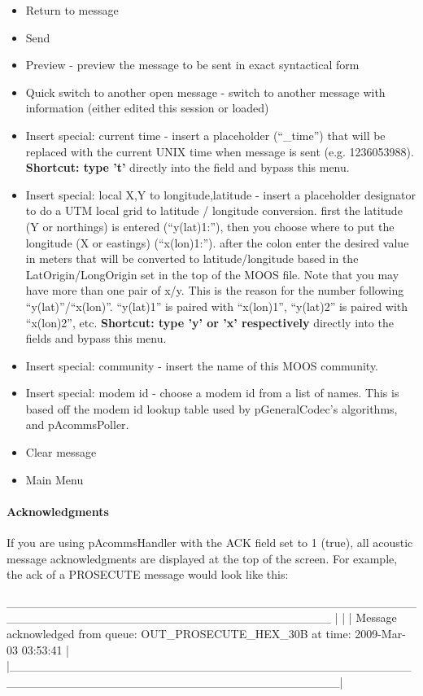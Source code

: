 \documentclass[11pt, letterpaper, oneside]{memoir}
\begin{document}
\begin{itemize}
\item Return to message
\item Send
\item Preview - preview the message to be sent in exact syntactical form
\item Quick switch to another open message - switch to another message with information (either edited this session or loaded)
\item Insert special: current time - insert a placeholder (``\_time'') that will be replaced with the current UNIX time when message is sent (e.g. 1236053988). \textbf{Shortcut: type 't'} directly into the field and bypass this menu.
\item Insert special: local X,Y to longitude,latitude - insert a placeholder designator to do a UTM local grid to latitude / longitude conversion. first the latitude (Y or northings) is entered (``y(lat)1:''), then you choose where to put the longitude (X or eastings) (``x(lon)1:''). after the colon enter the desired value in meters that will be converted to latitude/longitude based in the LatOrigin/LongOrigin set in the top of the MOOS file. Note that you may have more than one pair of x/y. This is the reason for the number following ``y(lat)''/``x(lon)''. ``y(lat)1'' is paired with ``x(lon)1'', ``y(lat)2'' is paired with ``x(lon)2'', etc. \textbf{Shortcut: type 'y' or 'x' respectively} directly into the fields and bypass this menu.
\item Insert special: community - insert the name of this MOOS community.
\item Insert special: modem id - choose a modem id from a list of names. This is based off the modem id lookup table used by pGeneralCodec's algorithms, and pAcommsPoller.
\item Clear message
\item Main Menu
\end{itemize}

\paragraph{Acknowledgments}
If you are using pAcommsHandler with the ACK field set to 1 (true), all acoustic message acknowledgments are displayed at the top of the screen. For example, the ack of a PROSECUTE message would look like this:
\begin{boxedverbatim}
  ______________________________________________________________________________________
 |                                                                                      |
 | Message acknowledged from queue: OUT_PROSECUTE_HEX_30B at time: 2009-Mar-03 03:53:41 |
 |______________________________________________________________________________________|
\end{boxedverbatim}
\resetbvlinenumber
\end{document}
